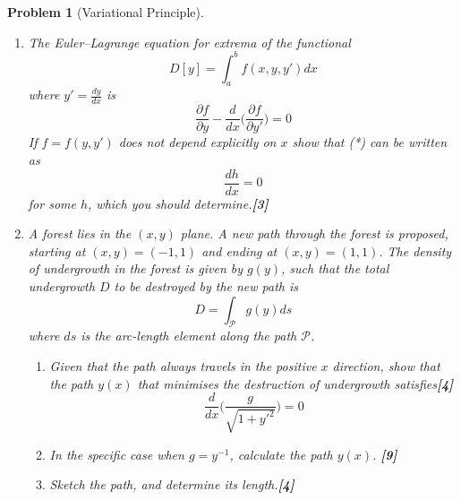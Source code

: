 \documentclass[a4paper]{article}
\theoremstyle{new}
\newtheorem{qns}{Problem}[section]
\begin{document}
\newpage
\begin{qns}[Variational Principle]\leavevmode
\begin{enumerate}[label=(\alph*)]
\item The Euler–Lagrange equation for extrema of the functional
$$D[y]=\int_a^bf(x,y,y')dx$$
where $y'=\frac{dy}{dx}$ is
\begin{equation}
\frac{\partial f}{\partial y}-\frac{d}{dx}\bigg(\frac{\partial f}{\partial y'}\bigg)=0\tag{*}
\end{equation}
If $f = f(y, y')$ does not depend explicitly on $x$ show that (*) can be written as
$$\frac{dh}{dx}=0$$
for some $h$, which you should determine.\hfill\textbf{[3]}
\item A forest lies in the $(x, y)$ plane. A new path through the forest is proposed, starting at $(x, y) = (−1, 1)$ and ending at $(x, y) = (1, 1)$. The density of undergrowth in the forest is given by $g(y)$, such that the total undergrowth $D$ to be destroyed by the new path is
$$D=\int_{\mathcal{P}}g(y)ds$$
where $ds$ is the arc-length element along the path $\mathcal{P}$.
\begin{enumerate}[label=(\roman*)]
\item Given that the path always travels in the positive $x$ direction, show that the path $y(x)$ that minimises the destruction of undergrowth satisfies\hfill\textbf{[4]}
$$\frac{d}{dx}\bigg(\frac{g}{\sqrt{1+y'^2}}\bigg)=0$$
\item In the specific case when $g=y^{-1}$, calculate the path $y(x)$. \hfill\textbf{[9]}
\item Sketch the path, and determine its length.\hfill\textbf{[4]}
\end{enumerate}
\end{enumerate}
\end{qns}
\end{document}
